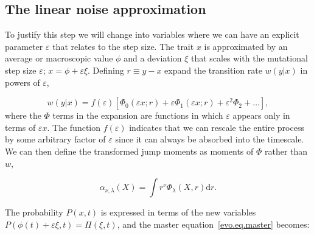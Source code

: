 \subsection{The linear noise approximation}
To justify this step we will change into variables where we can have an explicit parameter $\varepsilon$ that relates to the step size. The trait $x$ is approximated by an average or macroscopic value $\phi$ and a deviation $\xi$ that scales with the mutational step size $\varepsilon$; $x = \phi + \varepsilon \xi$.  Defining $r \equiv y-x$ expand the transition rate $w(y|x)$ in powers of $\varepsilon$, 
 
\begin{equation}
w(y|x) = f(\varepsilon) \left[ \Phi_0(\varepsilon x; r ) +  \varepsilon \Phi_1(\varepsilon x; r ) + \varepsilon^2 \Phi_2+\ldots \right],
\label{transformed_w}
\end{equation}
where the $\Phi$ terms in the expansion are functions in which $\varepsilon$ appears only in terms of $\varepsilon x$.  The function $f(\varepsilon)$ indicates that we can rescale the entire process by some arbitrary factor of $\varepsilon$ since it can always be absorbed into the timescale.  We can then define the transformed jump moments as moments of $\Phi$ rather than $w$,
 
\begin{equation}
\alpha_{\nu, \lambda}(X) = \int r^{\nu} \Phi_{\lambda}(X,r) \mathrm{d} r . 
\end{equation}
 
The probability $P(x,t)$ is expressed in terms of the new variables $P(\phi(t) + \varepsilon \xi, t) = \Pi(\xi,t)$, and the master equation~\eqref{evo.eq.master} becomes:
 
